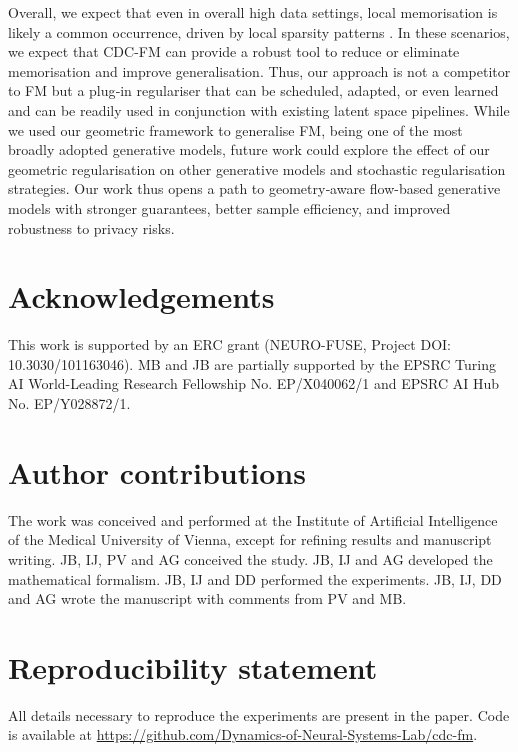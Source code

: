 \documentclass{article} %
\begin{document}
Overall, we expect that even in overall high data settings, local memorisation is likely a common occurrence, driven by local sparsity patterns \citep{Skrinjar}. 
In these scenarios, we expect that CDC-FM can provide a robust tool to reduce or eliminate memorisation and improve generalisation. Thus, our approach is not a competitor to FM but a plug‑in regulariser that can be scheduled, adapted, or even learned and can be readily used in conjunction with existing latent space pipelines. 
While we used our geometric framework to generalise FM, being one of the most broadly adopted generative models, future work could explore the effect of our geometric regularisation on other generative models and stochastic regularisation strategies.
Our work thus opens a path to geometry‑aware flow-based generative models with stronger guarantees, better sample efficiency, and improved robustness to privacy risks.

\section{Acknowledgements}

This work is supported by an ERC grant (NEURO-FUSE, Project DOI: 10.3030/101163046). MB and JB are partially supported by
the EPSRC Turing AI World-Leading Research Fellowship
No. EP/X040062/1 and EPSRC AI Hub No. EP/Y028872/1.

\section{Author contributions}

The work was conceived and performed at the Institute of Artificial Intelligence of the Medical University of Vienna, except for refining results and manuscript writing. JB, IJ, PV and AG conceived the study. JB, IJ and AG developed the mathematical formalism. JB, IJ and DD performed the experiments. JB, IJ, DD and AG wrote the manuscript with comments from PV and MB.

\section{Reproducibility statement} 
All details necessary to reproduce the experiments are present in the paper. Code is available at \url{https://github.com/Dynamics-of-Neural-Systems-Lab/cdc-fm}.



\end{document}
